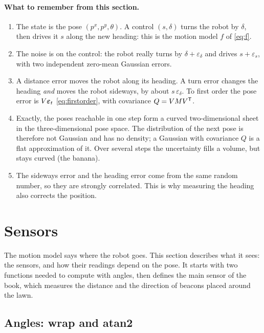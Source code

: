 \paragraph{What to remember from this section.}
\begin{enumerate}[nosep]
  \item The state is the pose $(p^x,p^y,\theta)$. A control $(s,\delta)$
    turns the robot by $\delta$, then drives it $s$ along the new heading:
    this is the motion model $f$ of \eqref{eq:f}.
  \item The noise is on the control: the robot really turns by
    $\delta+\varepsilon_\delta$ and drives $s+\varepsilon_s$, with two
    independent zero-mean Gaussian errors.
  \item A distance error moves the robot along its heading. A turn error
    changes the heading \emph{and} moves the robot sideways, by about
    $s\,\varepsilon_\delta$. To first order the pose error is
    $V\bm{\varepsilon}_t$ \eqref{eq:firstorder}, with covariance $Q=VMV^{\mathsf{T}}$.
  \item Exactly, the poses reachable in one step form a curved
    two-dimensional sheet in the three-dimensional pose space. The
    distribution of the next pose is therefore not Gaussian and has no
    density; a Gaussian with covariance $Q$ is a flat approximation of it.
    Over several steps the uncertainty fills a volume, but stays curved
    (the banana).
  \item The sideways error and the heading error come from the same random
    number, so they are strongly correlated. This is why measuring the
    heading also corrects the position.
\end{enumerate}

\section{Sensors}
\label{sec:sensors}

The motion model says where the robot goes. This section describes what it
sees: the sensors, and how their readings depend on the pose. It starts
with two functions needed to compute with angles, then defines the main sensor of the
book, which measures the distance and the direction of beacons placed
around the lawn.

\subsection{Angles: wrap and atan2}
\label{sec:angles}

